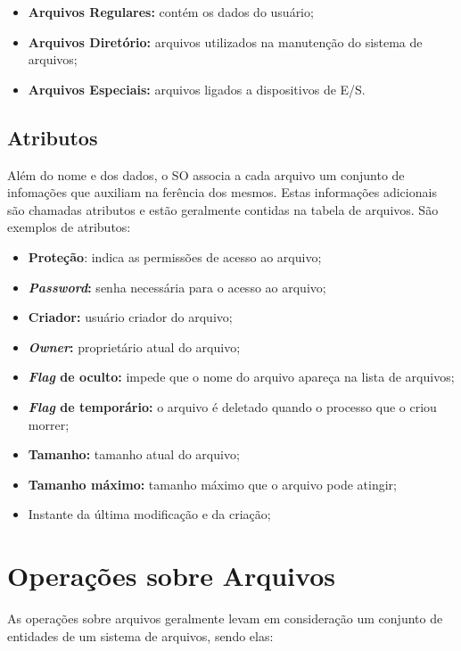 \begin{itemize}
  \item \textbf{Arquivos Regulares:} contém os dados do usuário;
  \item \textbf{Arquivos Diretório:} arquivos utilizados na manutenção do sistema de arquivos;
  \item \textbf{Arquivos Especiais:} arquivos ligados a dispositivos de E/S.
\end{itemize}


\subsection{Atributos}
Além do nome e dos dados, o SO associa a cada arquivo um conjunto de infomações que auxiliam na ferência dos mesmos. Estas informações adicionais são chamadas atributos e estão geralmente contidas na tabela de arquivos. São exemplos de atributos:

\begin{itemize}
  \item \textbf{Proteção}: indica as permissões de acesso ao arquivo;
  \item \textbf{\textit{Password}:} senha necessária para o acesso ao arquivo;
  \item \textbf{Criador:} usuário criador do arquivo;
  \item \textbf{\textit{Owner}:} proprietário atual do arquivo;
  \item \textbf{\textit{Flag} de oculto:} impede que o nome do arquivo apareça na lista de arquivos;
  \item \textbf{\textit{Flag} de temporário:} o arquivo é deletado quando o processo que o criou morrer;
  \item \textbf{Tamanho:} tamanho atual do arquivo;
  \item \textbf{Tamanho máximo:} tamanho máximo que o arquivo pode atingir;
  \item Instante da última modificação e da criação;
\end{itemize}





\section{Operações sobre Arquivos}
As operações sobre arquivos geralmente levam em consideração um conjunto de entidades de um sistema de arquivos, sendo elas:

